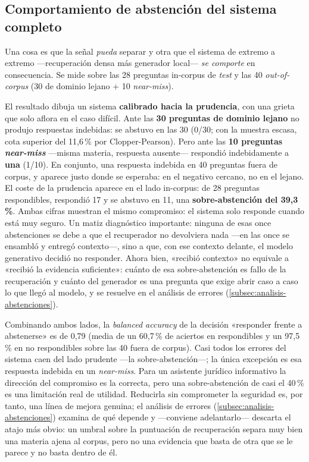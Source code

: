 \subsection{Comportamiento de abstención del sistema completo}
\label{subsec:abstencion-observada}

Una cosa es que la señal \emph{pueda} separar y otra que el sistema de extremo a extremo —recuperación densa más generador local— \emph{se comporte} en consecuencia. Se mide sobre las 28 preguntas in-corpus de \emph{test} y las 40 \emph{out-of-corpus} (30 de dominio lejano + 10 \emph{near-miss}).

El resultado dibuja un sistema \textbf{calibrado hacia la prudencia}, con una grieta que solo aflora en el caso difícil. Ante las \textbf{30 preguntas de dominio lejano} no produjo respuestas indebidas: se abstuvo en las 30 (0/30; con la muestra escasa, cota superior del 11,6\,\% por Clopper-Pearson). Pero ante las \textbf{10 preguntas \emph{near-miss}} —misma materia, respuesta ausente— respondió indebidamente a \textbf{una} (1/10). En conjunto, una respuesta indebida en 40 preguntas fuera de corpus, y aparece justo donde se esperaba: en el negativo cercano, no en el lejano. El coste de la prudencia aparece en el lado in-corpus: de 28 preguntas respondibles, respondió 17 y se abstuvo en 11, una \textbf{sobre-abstención del 39,3\,\%}. Ambas cifras muestran el mismo compromiso: el sistema solo responde cuando está muy seguro. Un matiz diagnóstico importante: ninguna de esas once abstenciones se debe a que el recuperador no devolviera nada —en las once se ensambló y entregó contexto—, sino a que, con ese contexto delante, el modelo generativo decidió no responder. Ahora bien, «recibió contexto» no equivale a «recibió la evidencia suficiente»: cuánto de esa sobre-abstención es fallo de la recuperación y cuánto del generador es una pregunta que exige abrir caso a caso lo que llegó al modelo, y se resuelve en el análisis de errores (\ref{subsec:analisis-abstenciones}).

Combinando ambos lados, la \emph{balanced accuracy} de la decisión «responder frente a abstenerse» es de 0,79 (media de un 60,7\,\% de aciertos en respondibles y un 97,5\,\% en no respondibles sobre las 40 fuera de corpus). Casi todos los errores del sistema caen del lado prudente —la sobre-abstención—; la única excepción es esa respuesta indebida en un \emph{near-miss}. Para un asistente jurídico informativo la dirección del compromiso es la correcta, pero una sobre-abstención de casi el 40\,\% es una limitación real de utilidad. Reducirla sin comprometer la seguridad es, por tanto, una línea de mejora genuina; el análisis de errores (\ref{subsec:analisis-abstenciones}) examina de qué depende y —conviene adelantarlo— descarta el atajo más obvio: un umbral sobre la puntuación de recuperación separa muy bien una materia ajena al corpus, pero no una evidencia que basta de otra que se le parece y no basta dentro de él.

